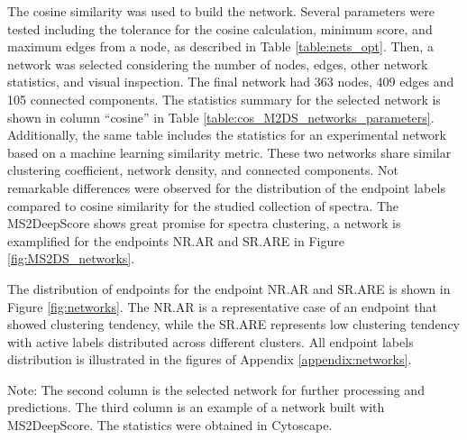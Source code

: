 The cosine similarity was used to build the network. Several parameters were tested including the tolerance for the cosine calculation, minimum score, and maximum edges from a node, as described in Table \ref{table:nets_opt}. Then, a network was selected considering the number of nodes, edges, other network statistics, and visual inspection. The final network had 363 nodes, 409 edges and 105 connected components. The statistics summary for the selected network is shown in column ``cosine'' in Table \ref{table:cos_M2DS_networks_parameters}. Additionally, the same table includes the statistics for an experimental network based on a machine learning similarity metric. These two networks share similar clustering coefficient, network density, and connected components. Not remarkable differences were observed for the distribution of the endpoint labels compared to cosine similarity for the studied collection of spectra. The MS2DeepScore shows great promise for spectra clustering, a network is examplified for the endpoints NR.AR and SR.ARE in Figure \ref{fig:MS2DS_networks}.

The distribution of endpoints for the endpoint NR.AR and SR.ARE is shown in Figure \ref{fig:networks}. The NR.AR is a representative case of an endpoint that showed clustering tendency, while the SR.ARE represents low clustering tendency with active labels distributed across different clusters. All endpoint labels distribution is illustrated in the figures of Appendix \ref{appendix:networks}.


\begin{table}[h]
\centering
\footnotesize
{}
\caption*{Note: The second column is the selected network for further processing and predictions. The third column is an example of a network built with MS2DeepScore. The statistics were obtained in Cytoscape.}
\end{table}


